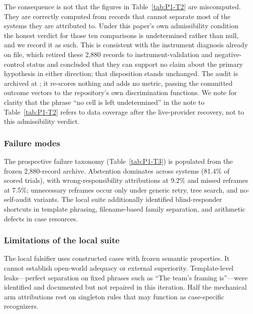 The consequence is not that the figures in Table~\ref{tab:P1-T2} are miscomputed.
They are correctly computed from records that cannot separate most of the systems
they are attributed to. Under this paper's own admissibility condition the honest
verdict for those ten comparisons is undetermined rather than null, and we record it
as such. This is consistent with the instrument diagnosis already on file, which
retired these 2,880 records to instrument-validation and negative-control status and
concluded that they can support no claim about the primary hypothesis in either
direction; that disposition stands unchanged. The audit is archived at
; it
re-scores nothing and adds no metric, passing the committed outcome vectors to the
repository's own discrimination functions. We note for clarity that the phrase ``no
cell is left undetermined'' in the note to Table~\ref{tab:P1-T2} refers to data
coverage after the live-provider recovery, not to this admissibility verdict.



\subsubsection{Failure modes}
The prospective failure taxonomy (Table~\ref{tab:P1-T3}) is populated from the
frozen 2,880-record archive. Abstention dominates across systems (81.4\% of
scored trials), with wrong-responsibility attributions at 9.2\% and missed
reframes at 7.5\%; unnecessary reframes occur only under generic retry, tree
search, and no-self-audit variants. The local suite additionally identified
blind-responder shortcuts in template phrasing, filename-based family
separation, and arithmetic defects in case resources.



\subsubsection{Limitations of the local suite}
The local falsifier uses constructed cases with frozen semantic properties. It
cannot establish open-world adequacy or external superiority. Template-level
leaks---perfect separation on fixed phrases such as ``The team's framing
is''---were identified and documented but not repaired in this iteration. Half
the mechanical arm attributions rest on singleton rules that may function as
case-specific recognizers.

